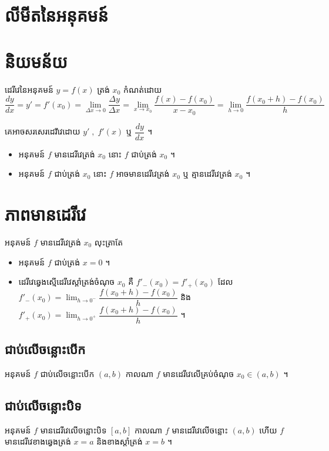 \documentclass[a4paper,12pt]{article}
\begin{document}
\section*{\centering \huge លីមីតនៃអនុគមន៍}
\section{និយមន័យ}
\begin{definition}
	ដេរីវេនៃអនុគមន៍ $y=f(x)$ ត្រង់ $x_0$ កំណត់ដោយ $$\dfrac{dy}{dx}=y'=f'(x_0)=\lim_{\Delta x \to 0} \dfrac{\Delta y}{\Delta x}=\lim _{x\to x_0}\dfrac{f(x)-f(x_0)}{x-x_0}=\lim_{h\to 0}\dfrac{f(x_0+h)-f(x_0)}{h}$$
\end{definition}
\begin{notation}
	គេអាចសរសេរដេរីវេដោយ $y' \;, \; f'(x)$ ឬ $\dfrac{dy}{dx}$ ។
\end{notation}
\begin{itemize}
	\item អនុគមន៍ $f$ មានដេរីវេត្រង់ $x_0$ នោះ $f$ ជាប់ត្រង់ $x_0$ ។
	\item អនុគមន៍ $f$ ជាប់ត្រង់ $x_0$ នោះ $f$ អាចមានដេរីវេត្រង់ $x_0$ ឬ គ្មានដេរីវេត្រង់ $x_0$ ។
\end{itemize}
\section{ភាពមានដេរីវេ}
\begin{definition}
	អនុគមន៍ $f$ មានដេរីវេត្រង់ $x_0$ លុះត្រាតែ
	\begin{itemize}
		\item អនុគមន៍ $f$ ជាប់ត្រង់ $x=0$ ។
		\item ដេរីវេឆ្វេងស្មើដេរីវេស្តាំត្រង់ចំណុច $x_0$ គឺ $f'_-(x_0)=f'_+(x_0)$ ដែល \\
		      $f'_-(x_0)=\lim_{h\to 0^-}\dfrac{f(x_0+h)-f(x_0)}{h}$ និង $f'_+(x_0)=\lim_{h\to 0^+}\dfrac{f(x_0+h)-f(x_0)}{h}$ ។
	\end{itemize}
\end{definition}
\subsection{ជាប់លើចន្លោះបើក}
\begin{definition}
	អនុគមន៍ $f$ ជាប់លើចន្លោះបើក $(a,b)$ កាលណា $f$ មានដេរីវេលើគ្រប់ចំណុច $x_0\in (a,b)$ ។
\end{definition}
\subsection{ជាប់លើចន្លោះបិទ}
\begin{definition}
	អនុគមន៍ $f$ មានដេរីវេលើចន្លោះបិទ $[a,b]$ កាលណា $f$ មានដេរីវេលើចន្លោះ $(a,b)$ ហើយ $f$
	មានដេរីវេខាងឆ្វេងត្រង់ $x=a$ និងខាងស្តាំត្រង់ $x=b$ ។
\end{definition}
\end{document}
